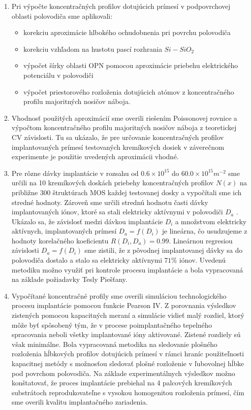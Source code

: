 \begin{enumerate}
\item Pri výpočte koncentračných profilov dotujúcich prímesí v
  podpovrchovej oblasti polovodiča sme aplikovali:
\begin{itemize}
\item korekciu aproximácie hlbokého ochudobnenia pri povrchu
  polovodiča
\item korekciu vzhľadom na hustotu pascí rozhrania $Si-SiO_{2}$
\item výpočet šírky oblasti OPN pomocou aproximácie priebehu
  elektrického potenciálu v polovodiči
\item výpočet priestorového rozloženia dotujúcich atómov z
  koncentračného profilu majoritných nosičov náboja.
\end{itemize}

\item Vhodnosť použitých aproximácií sme overili riešením Poissonovej
  rovnice a výpočtom koncentračného profilu majoritných nosičov náboja
  z teoretickej CV závislosti.  Tu sa ukázalo, že pre určovanie
  koncentračných profilov implantovaných prímesí testovaných
  kremíkových dosiek v záverečnom experimente je použitie uvedených
  aproximácii vhodné.

\item Pre rôzne dávky implantácie v rozsahu od $0.6 \times 10^{15}$ do
  $60.0 \times 10^{15} m^{-2}$ sme určili na 10 kremíkových doskách
  priebehy koncentračných profilov $N(x)$ na približne 300 štruktúrach
  MOS každej testovanej dosky a vypočítali sme ich stredné
  hodnoty. Zároveň sme určili strednú hodnotu časti dávky
  implantovaných iónov, ktoré sa stali elektricky aktívnymi v
  polovodiči $D_{a}$ . Ukázalo sa, že závislosť medzi dávkou
  implantácie $D_{i}$ a množstvom elektricky aktívnych, implantovaných
  prímesí $D_{a}=f(D_{i})$ je lineárna, čo usudzujeme z hodnoty
  korelačného koeficientu $R(D_{i},D_{a})=0.99$.  Lineárnou regresiou
  závislosti $D_{a}=f(D_{i})$ sme zistili, že z pôvodnej implantovanej
  dávky sa do polovodiča dostalo a stalo sa elektricky aktívnymi
  $71\%$ iónov. Uvedenú metodiku možno využiť pri kontrole procesu
  implantácie a bola vypracovaná na základe požiadavky Tesly Piešťany.

\item Vypočítané koncentračné profily sme overili simuláciou
  technologického procesu implantácie pomocou funkcie Pearson IV. Z
  porovnania výsledkov zistených pomocou kapacitných meraní a
  simulácie vidieť malý rozdiel, ktorý môže byť spôsobený tým, že v
  procese poimplantačného tepelného spracovania neboli všetky
  implantované ióny aktivované.  Zistené rozdiely sú však
  minimálne. Bola vypracovaná metodika na sledovanie plošného
  rozloženia hĺbkových profilov dotujúcich prímesí v rámci hraníc
  použiteľnosti kapacitnej metódy s možnosťou sledovať plošné
  rozloženie v ľubovolnej hĺbke pod povrchom polovodiča. Na základe
  experimentálnych výsledkov možno konštatovať, že proces implantácie
  prebiehal na 4 palcových kremíkových substrátoch reprodukovateľne s
  vysokou homogenitou rozloženia prímesí, čím sme overili kvalitu
  implantačného zariadenia.


\end{enumerate}
